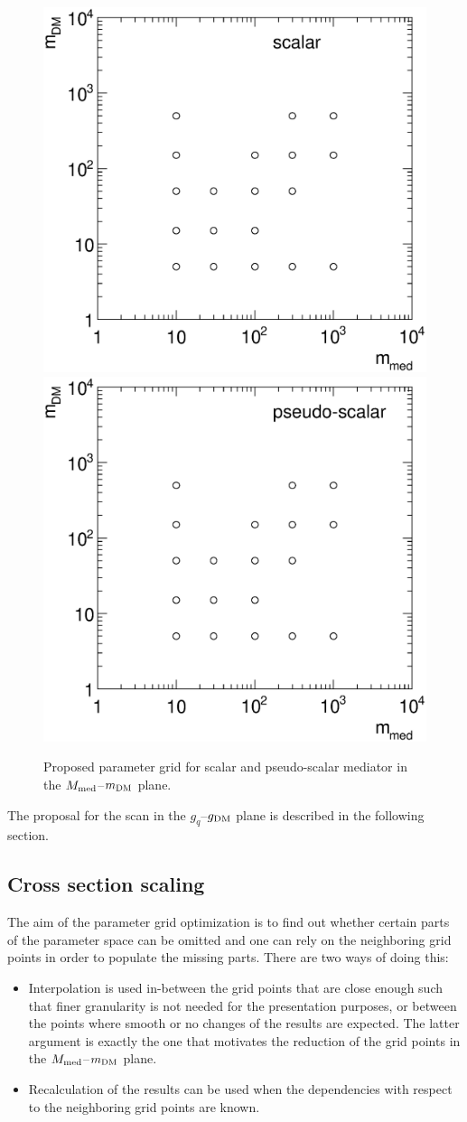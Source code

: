 \begin{figure}
\centering
\includegraphics[width=0.45\linewidth]{figures/monojet/grid_S.eps}
\includegraphics[width=0.45\linewidth]{figures/monojet/grid_P.eps}
\caption{Proposed parameter grid for scalar and pseudo-scalar mediator in the $M_{\rm{med}}$--$m_{\rm{DM}}$ plane.}
\label{fig:monojet_grid_S}
\end{figure}

The proposal for the scan in the $g_q$--$g_{\rm{DM}}$ plane is described in the following section.






\subsection{Cross section scaling}
\label{sec:monojet_scaling}

The aim of the parameter grid optimization is to find out whether certain parts of the parameter space can be omitted and one can rely on the neighboring grid points in order to populate the missing parts. There are two ways of doing this:
\begin{itemize}
\item Interpolation is used in-between the grid points that are close enough such that finer granularity is not needed for the presentation purposes, or between the points where smooth or no changes of the results are expected. The latter argument is exactly the one that motivates the reduction of the grid points in the $M_{\rm{med}}$--$m_{\rm{DM}}$ plane.\\
\item Recalculation of the results can be used when the dependencies with respect to the neighboring grid points are known.\\
\end{itemize}

